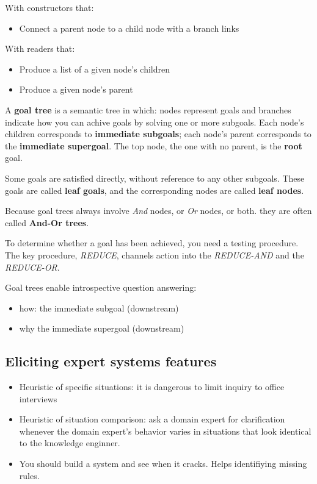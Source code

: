 \documentclass{article}
\begin{document}
With constructors that:
\begin{itemize}
\item Connect a parent node to a child node with a branch links
\end{itemize}
With readers that:
\begin{itemize}
\item Produce a list of a given node's children
\item Produce a given node's parent
\end{itemize}

A \textbf{goal tree} is a semantic tree in which: nodes represent goals and branches indicate how you can achive goals by solving one or more subgoals. Each node's children corresponds to \textbf{immediate subgoals}; each node's parent corresponds to the \textbf{immediate supergoal}. The top node, the one with no parent, is the \textbf{root} goal.

Some goals are satisfied directly, without reference to any other subgoals. These goals are called \textbf{leaf goals}, and the corresponding nodes are called \textbf{leaf nodes}.

Because goal trees always involve \textit{And} nodes, or \textit{Or} nodes, or both. they are often called \textbf{And-Or trees}.

To determine whether a goal has been achieved, you need a testing procedure. The key procedure, \textit{REDUCE}, channels action into the \textit{REDUCE-AND} and the \textit{REDUCE-OR}.

Goal trees enable introspective question answering:
\begin{itemize}
  \item how: the immediate subgoal (downstream) 
  \item why the immediate supergoal (downstream) 
\end{itemize}

\subsection{Eliciting expert systems features}
\begin{itemize}
  \item Heuristic of specific situations: it is dangerous to limit inquiry to office interviews
  \item Heuristic of situation comparison: ask a domain expert for clarification whenever the domain expert's behavior varies in situations that look identical to the knowledge enginner.
  \item You should build a system and see when it cracks. Helps identifiying missing rules.
\end{itemize}
\end{document}
